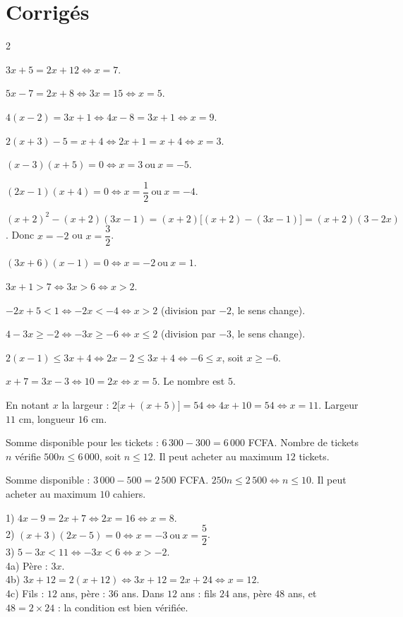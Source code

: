 \section{Corrigés}
\begin{multicols}{2}

$3x+5=2x+12\iff x=7$.

$5x-7=2x+8\iff3x=15\iff x=5$.

$4(x-2)=3x+1\iff4x-8=3x+1\iff x=9$.

$2(x+3)-5=x+4\iff2x+1=x+4\iff x=3$.

$(x-3)(x+5)=0\iff x=3\ \text{ou}\ x=-5$.

$(2x-1)(x+4)=0\iff x=\dfrac12\ \text{ou}\ x=-4$.

$(x+2)^{2}-(x+2)(3x-1)=(x+2)\big[(x+2)-(3x-1)\big]=(x+2)(3-2x)$. Donc $x=-2$ ou
$x=\dfrac32$.

$(3x+6)(x-1)=0\iff x=-2\ \text{ou}\ x=1$.

$3x+1>7\iff3x>6\iff x>2$.

$-2x+5<1\iff-2x<-4\iff x>2$ (division par $-2$, le sens change).

$4-3x\ge-2\iff-3x\ge-6\iff x\le2$ (division par $-3$, le sens change).

$2(x-1)\le3x+4\iff2x-2\le3x+4\iff-6\le x$, soit $x\ge-6$.

$x+7=3x-3\iff10=2x\iff x=5$. Le nombre est $5$.

En notant $x$ la largeur : $2\big[x+(x+5)\big]=54\iff4x+10=54\iff x=11$. Largeur $11$ cm,
longueur $16$ cm.

Somme disponible pour les tickets : $6\,300-300=6\,000$ FCFA. Nombre de tickets $n$ vérifie
$500n\le6\,000$, soit $n\le12$. Il peut acheter au maximum $12$ tickets.

Somme disponible : $3\,000-500=2\,500$ FCFA. $250n\le2\,500\iff n\le10$. Il peut acheter au
maximum $10$ cahiers.

1) $4x-9=2x+7\iff2x=16\iff x=8$.\\
2) $(x+3)(2x-5)=0\iff x=-3\ \text{ou}\ x=\dfrac52$.\\
3) $5-3x<11\iff-3x<6\iff x>-2$.\\
4a) Père : $3x$.\\
4b) $3x+12=2(x+12)\iff3x+12=2x+24\iff x=12$.\\
4c) Fils : $12$ ans, père : $36$ ans. Dans $12$ ans : fils $24$ ans, père $48$ ans, et
$48=2\times24$ : la condition est bien vérifiée.


\end{multicols}
